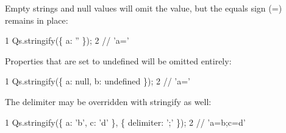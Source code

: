 Empty strings and null values will omit the value, but the equals sign (=) remains in place\+:


\begin{DoxyCode}
1 Qs.stringify(\{ a: '' \});
2 // 'a='
\end{DoxyCode}


Properties that are set to {\ttfamily undefined} will be omitted entirely\+:


\begin{DoxyCode}
1 Qs.stringify(\{ a: null, b: undefined \});
2 // 'a='
\end{DoxyCode}


The delimiter may be overridden with stringify as well\+:


\begin{DoxyCode}
1 Qs.stringify(\{ a: 'b', c: 'd' \}, \{ delimiter: ';' \});
2 // 'a=b;c=d'
\end{DoxyCode}
 